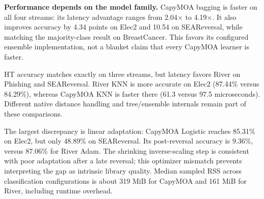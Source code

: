 \textbf{Performance depends on the model family.} CapyMOA bagging is faster on all four streams: its latency advantage ranges from 2.04$\times$ to 4.19$\times$. It also improves accuracy by 4.34 points on Elec2 and 10.54 on SEAReversal, while matching the majority-class result on BreastCancer. This favors its configured ensemble implementation, not a blanket claim that every CapyMOA learner is faster.

HT accuracy matches exactly on three streams, but latency favors River on Phishing and SEAReversal. River KNN is more accurate on Elec2 (87.44\% versus 84.29\%), whereas CapyMOA KNN is faster there (61.3 versus 97.5 microseconds). Different native distance handling and tree/ensemble internals remain part of these comparisons.

The largest discrepancy is linear adaptation: CapyMOA Logistic reaches 85.31\% on Elec2, but only 48.89\% on SEAReversal. Its post-reversal accuracy is 9.36\%, versus 87.06\% for River Adam. The shrinking inverse-scaling step is consistent with poor adaptation after a late reversal; this optimizer mismatch prevents interpreting the gap as intrinsic library quality. Median sampled RSS across classification configurations is about 319 MiB for CapyMOA and 161 MiB for River, including runtime overhead.
